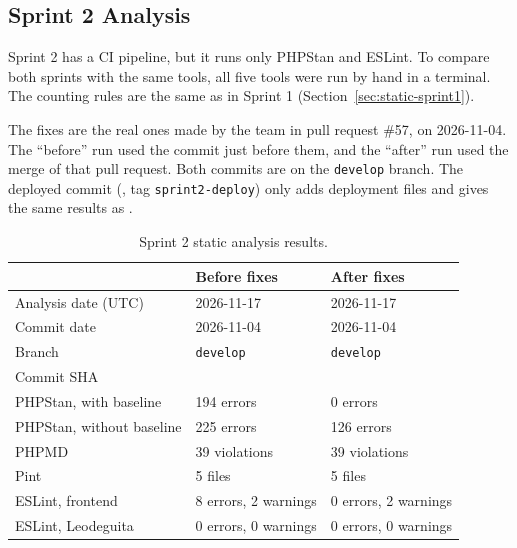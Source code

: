\subsection{Sprint 2 Analysis}
\label{sec:static-sprint2}

Sprint 2 has a CI pipeline, but it runs only PHPStan and ESLint.
To compare both sprints with the same tools, all five tools were run by hand in a terminal.
The counting rules are the same as in Sprint 1 (Section~\ref{sec:static-sprint1}).

The fixes are the real ones made by the team in pull request \#57, on 2026-11-04.
The ``before'' run used the commit just before them, and the ``after'' run used the merge of that pull request.
Both commits are on the \texttt{develop} branch.
The deployed commit (, tag \texttt{sprint2-deploy}) only adds deployment files and gives the same results as .

\begin{table}[H]
  \centering
  \begin{tabularx}{\linewidth}{L{4.6cm}YY}
    \toprule
    & Before fixes & After fixes \\
    \midrule
    Analysis date (UTC) & 2026-11-17 & 2026-11-17 \\
    Commit date & 2026-11-04 & 2026-11-04 \\
    Branch & \texttt{develop} & \texttt{develop} \\
    Commit SHA &  &  \\
    \midrule
    PHPStan, with baseline & 194 errors & 0 errors \\
    PHPStan, without baseline & 225 errors & 126 errors \\
    PHPMD & 39 violations & 39 violations \\
    Pint & 5 files & 5 files \\
    ESLint, frontend & 8 errors, 2 warnings & 0 errors, 2 warnings \\
    ESLint, Leodeguita & 0 errors, 0 warnings & 0 errors, 0 warnings \\
    \bottomrule
  \end{tabularx}
  \caption{Sprint 2 static analysis results.}
  \label{tab:static-sprint2}
\end{table}



